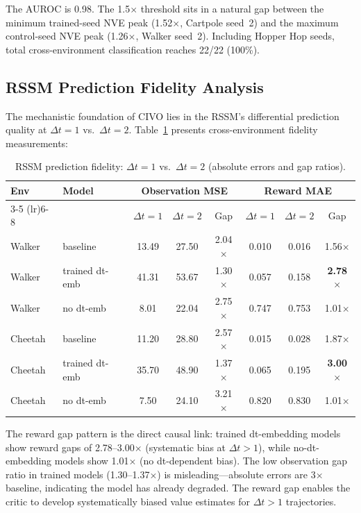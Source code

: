\documentclass[10pt,letterpaper]{article}
\begin{document}
The AUROC is 0.98. The 1.5$\times$ threshold sits in a natural gap between the minimum trained-seed NVE peak (1.52$\times$, Cartpole seed~2) and the maximum control-seed NVE peak (1.26$\times$, Walker seed~2). Including Hopper Hop seeds, total cross-environment classification reaches 22/22 (100\%).

\subsection{RSSM Prediction Fidelity Analysis}
\label{sec:rssm}

The mechanistic foundation of CIVO lies in the RSSM's differential prediction quality at $\Delta t = 1$ vs.\ $\Delta t = 2$. Table~\ref{tab:rssm} presents cross-environment fidelity measurements:

\begin{table}[h]
\centering
\caption{RSSM prediction fidelity: $\Delta t = 1$ vs.\ $\Delta t = 2$ (absolute errors and gap ratios).}
\label{tab:rssm}
\begin{tabular}{llcccccc}
\toprule
Env & Model & \multicolumn{3}{c}{Observation MSE} & \multicolumn{3}{c}{Reward MAE} \\
\cmidrule(lr){3-5} \cmidrule(lr){6-8}
& & $\Delta t{=}1$ & $\Delta t{=}2$ & Gap & $\Delta t{=}1$ & $\Delta t{=}2$ & Gap \\
\midrule
Walker  & baseline       & 13.49 & 27.50 & 2.04$\times$ & 0.010 & 0.016 & 1.56$\times$ \\
Walker  & trained dt-emb & 41.31 & 53.67 & 1.30$\times$ & 0.057 & 0.158 & \textbf{2.78$\times$} \\
Walker  & no dt-emb      & 8.01  & 22.04 & 2.75$\times$ & 0.747 & 0.753 & 1.01$\times$ \\
\midrule
Cheetah & baseline       & 11.20 & 28.80 & 2.57$\times$ & 0.015 & 0.028 & 1.87$\times$ \\
Cheetah & trained dt-emb & 35.70 & 48.90 & 1.37$\times$ & 0.065 & 0.195 & \textbf{3.00$\times$} \\
Cheetah & no dt-emb      & 7.50  & 24.10 & 3.21$\times$ & 0.820 & 0.830 & 1.01$\times$ \\
\bottomrule
\end{tabular}
\end{table}

The reward gap pattern is the direct causal link: trained dt-embedding models show reward gaps of 2.78--3.00$\times$ (systematic bias at $\Delta t > 1$), while no-dt-embedding models show 1.01$\times$ (no dt-dependent bias). The low observation gap ratio in trained models (1.30--1.37$\times$) is misleading---absolute errors are 3$\times$ baseline, indicating the model has already degraded. The reward gap enables the critic to develop systematically biased value estimates for $\Delta t > 1$ trajectories.
\end{document}

